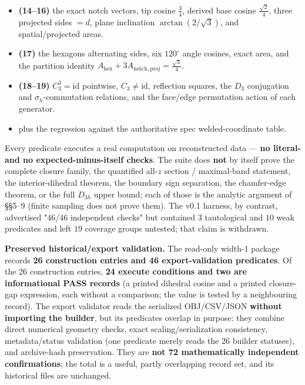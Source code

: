 \documentclass[
  11pt,
  a4paper,
]{article}
\begin{document}
\begin{itemize}
\item
  \textbf{(14--16)} the exact notch vectors, tip cosine \(\tfrac34\), derived base cosine \(\tfrac{\sqrt2}{4}\), three projected sides \(=d\), plane inclination \(\arctan(2/\sqrt3)\), and spatial/projected areas.
\item
  \textbf{(17)} the hexagon\textquotesingle s alternating sides, six \(120^\circ\) angle cosines, exact area, and the partition identity \(A_{\mathrm{hex}}+3A_{\mathrm{notch,proj}}=\tfrac{\sqrt3}{4}\).
\item
  \textbf{(18--19)} \(C_3^3=\mathrm{id}\) pointwise, \(C_3\ne\mathrm{id}\), reflection squares, the \(D_3\) conjugation and \(\sigma_h\)-commutation relations, and the face/edge permutation action of each generator.
\item
  plus the regression against the authoritative spec welded-coordinate table.
\end{itemize}

Every predicate executes a real computation on reconstructed data --- \textbf{no literal- and no expected-minus-itself checks}. The suite does \textbf{not} by itself prove the complete closure family, the quantified all-\(z\) section / maximal-band statement, the interior-dihedral theorem, the boundary sign separation, the chamfer-edge theorem, or the full \(D_{3h}\) upper bound; each of those is the analytic argument of §§5--9 (finite sampling does not prove them). The v0.1 harness, by contrast, advertised "46/46 independent checks" but contained \(3\) tautological and \(10\) weak predicates and left \(19\) coverage groups untested; that claim is withdrawn.

\textbf{Preserved historical/export validation.} The read-only width-1 package records \textbf{26 construction entries and 46 export-validation predicates}. Of the 26 construction entries, \textbf{24 execute conditions and two are informational PASS records} (a printed dihedral cosine and a printed closure-gap expression, each without a comparison; the value is tested by a neighbouring record). The export validator reads the serialized OBJ/CSV/JSON \textbf{without importing the builder}, but its predicates overlap in purpose: they combine direct numerical geometry checks, exact scaling/serialization consistency, metadata/status validation (one predicate merely reads the 26 builder statuses), and archive-hash preservation. They are \textbf{not 72 mathematically independent confirmations}; the total is a useful, partly overlapping record set, and its historical files are unchanged.
\end{document}
